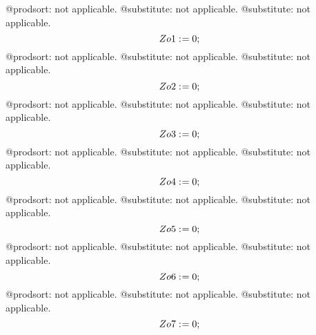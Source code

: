 \documentclass[11pt]{article}
\def\specialcolon{\mathrel{\mathop{:}}\hspace{-.5em}}
\begin{document}
@prodsort: not applicable.
@substitute: not applicable.
@substitute: not applicable.
\begin{dmath*}[compact, spread=2pt]
Zo1\specialcolon{}= 0;
\end{dmath*}
@prodsort: not applicable.
@substitute: not applicable.
@substitute: not applicable.
\begin{dmath*}[compact, spread=2pt]
Zo2\specialcolon{}= 0;
\end{dmath*}
@prodsort: not applicable.
@substitute: not applicable.
@substitute: not applicable.
\begin{dmath*}[compact, spread=2pt]
Zo3\specialcolon{}= 0;
\end{dmath*}
@prodsort: not applicable.
@substitute: not applicable.
@substitute: not applicable.
\begin{dmath*}[compact, spread=2pt]
Zo4\specialcolon{}= 0;
\end{dmath*}
@prodsort: not applicable.
@substitute: not applicable.
@substitute: not applicable.
\begin{dmath*}[compact, spread=2pt]
Zo5\specialcolon{}= 0;
\end{dmath*}
@prodsort: not applicable.
@substitute: not applicable.
@substitute: not applicable.
\begin{dmath*}[compact, spread=2pt]
Zo6\specialcolon{}= 0;
\end{dmath*}
@prodsort: not applicable.
@substitute: not applicable.
@substitute: not applicable.
\begin{dmath*}[compact, spread=2pt]
Zo7\specialcolon{}= 0;
\end{dmath*}
\end{document}
